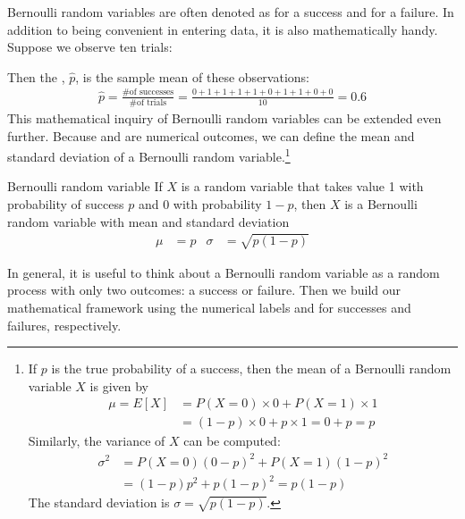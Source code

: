 Bernoulli random variables are often denoted as 
for a success and  for a failure.
In addition to being convenient in entering data,
it is also mathematically handy.
Suppose we observe ten trials:
\begin{center}
         
\end{center}
Then the , $\hat{p}$, is the
sample mean of these observations:
\begin{align*}
\hat{p} = \frac{\text{\# of successes}}{\text{\# of trials}}
    = \frac{0+1+1+1+1+0+1+1+0+0}{10} = 0.6
\end{align*}%
This mathematical inquiry of Bernoulli random variables can
be extended even further.
Because  and  are numerical outcomes,
we can define the {mean} and {standard deviation}
of a Bernoulli random variable.\footnote{If ${p}$ is the true probability of a success, then the mean of a Bernoulli random variable $X$ is given by
\begin{align*}
\mu = E[X] &= P(X = 0) \times 0 + P(X = 1) \times 1 \\
	&= (1 - p) \times 0 + p\times 1 = 0 + p = p
\end{align*}
Similarly, the variance of $X$ can be computed:
\begin{align*}
\sigma^2 &= {P(X=0)(0-p)^2 + P(X=1)(1-p)^2} \\
	&= {(1-p)p^2 + p(1-p)^2} = {p(1-p)}
\end{align*}
The standard deviation is $\sigma=\sqrt{p(1-p)}$.}

\begin{onebox}{Bernoulli random variable}
  If $X$ is a random variable that takes value 1 with
  probability of success $p$ and 0 with probability $1-p$,
  then $X$ is a Bernoulli random variable with mean
  and standard deviation
  \begin{align*}
  \mu &= p
      &\sigma&= \sqrt{p(1-p)}
  \end{align*}
\end{onebox}

In general, it is useful to think about a Bernoulli random variable as a random process with only two outcomes: a success or failure. Then we build our mathematical framework using the numerical labels  and  for successes and failures, respectively.

